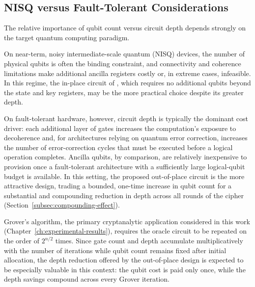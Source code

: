 \subsection{NISQ versus Fault-Tolerant Considerations}

The relative importance of qubit count versus circuit depth depends strongly on the target quantum computing paradigm.

On near-term, noisy intermediate-scale quantum (NISQ) devices, the number of physical qubits is often the binding constraint, and connectivity and coherence limitations make additional ancilla registers costly or, in extreme cases, infeasible. In this regime, the in-place circuit of \cite{cryptoeprint:2026/1007}, which requires no additional qubits beyond the state and key registers, may be the more practical choice despite its greater depth.

On fault-tolerant hardware, however, circuit depth is typically the dominant cost driver: each additional layer of gates increases the computation's exposure to decoherence and, for architectures relying on quantum error correction, increases the number of error-correction cycles that must be executed before a logical operation completes. Ancilla qubits, by comparison, are relatively inexpensive to provision once a fault-tolerant architecture with a sufficiently large logical-qubit budget is available. In this setting, the proposed out-of-place circuit is the more attractive design, trading a bounded, one-time increase in qubit count for a substantial and compounding reduction in depth across all rounds of the cipher (Section~\ref{subsec:compounding-effect}).

Grover's algorithm, the primary cryptanalytic application considered in this work (Chapter~\ref{ch:experimental-results}), requires the oracle circuit to be repeated on the order of $2^{n/2}$ times. Since gate count and depth accumulate multiplicatively with the number of iterations while qubit count remains fixed after initial allocation, the depth reduction offered by the out-of-place design is expected to be especially valuable in this context: the qubit cost is paid only once, while the depth savings compound across every Grover iteration.

